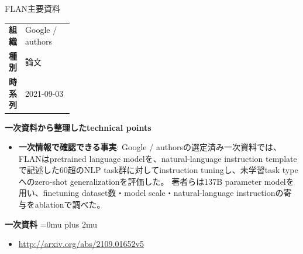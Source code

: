 \begin{technicalnote}{FLAN}{主要資料}
\begingroup
\begin{tabularx}{\linewidth}{@{}>{\bfseries}p{0.22\linewidth}X@{}}
組織 & Google / authors \\
種別 & 論文 \\
時系列 & 2021-09-03 \\
\end{tabularx}
\smallskip
\begin{minipage}{\linewidth}
{\bfseries 一次資料から整理したtechnical points}
\begin{itemize}[leftmargin=1.5em,itemsep=0.35em]
\item \textbf{一次情報で確認できる事実}: Google / authorsの選定済み一次資料では、FLANはpretrained language modelを、natural-language instruction templateで記述した60超のNLP task群に対してinstruction tuningし、未学習task typeへのzero-shot generalizationを評価した。 著者らは137B parameter modelを用い、finetuning dataset数・model scale・natural-language instructionの寄与をablationで調べた。
\end{itemize}
\begin{minipage}{\linewidth}
\begin{samepage}
{\bfseries 一次資料}
\begingroup\sloppy
\Urlmuskip=0mu plus 2mu\relax
\begin{itemize}[leftmargin=1.5em,itemsep=0.25em]
\item {\scriptsize\url{http://arxiv.org/abs/2109.01652v5}}
\end{itemize}
\endgroup
\end{samepage}
\end{minipage}
\end{minipage}
\endgroup
\end{technicalnote}
\medskip

